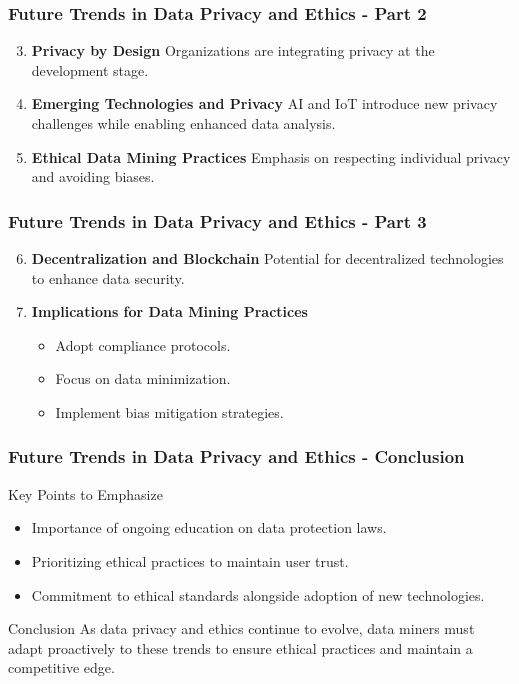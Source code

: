 \documentclass[aspectratio=169]{beamer}
\begin{document}
\begin{frame}[fragile]
    \frametitle{Future Trends in Data Privacy and Ethics - Part 2}
    \begin{enumerate}
        \setcounter{enumi}{2}
        \item \textbf{Privacy by Design}  
            Organizations are integrating privacy at the development stage.
            
        \item \textbf{Emerging Technologies and Privacy}  
            AI and IoT introduce new privacy challenges while enabling enhanced data analysis.
            
        \item \textbf{Ethical Data Mining Practices}  
            Emphasis on respecting individual privacy and avoiding biases. 
    \end{enumerate}
\end{frame}

\begin{frame}[fragile]
    \frametitle{Future Trends in Data Privacy and Ethics - Part 3}
    \begin{enumerate}
        \setcounter{enumi}{5}
        \item \textbf{Decentralization and Blockchain}  
            Potential for decentralized technologies to enhance data security.
            
        \item \textbf{Implications for Data Mining Practices}
            \begin{itemize}
                \item Adopt compliance protocols.
                \item Focus on data minimization.
                \item Implement bias mitigation strategies.
            \end{itemize}
    \end{enumerate}
\end{frame}

\begin{frame}[fragile]
    \frametitle{Future Trends in Data Privacy and Ethics - Conclusion}
    \begin{block}{Key Points to Emphasize}
        \begin{itemize}
            \item Importance of ongoing education on data protection laws.
            \item Prioritizing ethical practices to maintain user trust.
            \item Commitment to ethical standards alongside adoption of new technologies.
        \end{itemize}
    \end{block}
    
    \begin{block}{Conclusion}
        As data privacy and ethics continue to evolve, data miners must adapt proactively to these trends to ensure ethical practices and maintain a competitive edge.
    \end{block}
\end{frame}
\end{document}
